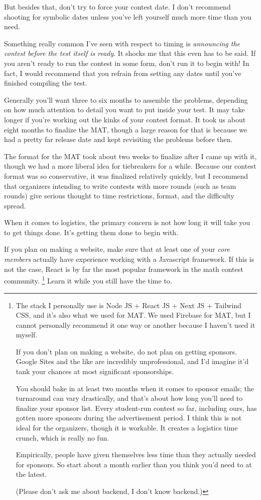 \documentclass[points=false]{bounce}
\begin{document}
But besides that, don't try to force your contest date. I don't recommend shooting for symbolic dates unless you've left yourself much more time than you need.

Something really common I've seen with respect to timing is \emph{announcing the contest before the test itself is ready}. It shocks me that this even has to be said. If you aren't ready to run the contest in some form, don't run it to begin with! In fact, I would recommend that you refrain from setting any dates until you've finished compiling the test.

Generally you'll want three to six months to assemble the problems, depending on how much attention to detail you want to put inside your test. It may take longer if you're working out the kinks of your contest format. It took us about eight months to finalize the MAT, though a large reason for that is because we had a pretty far release date and kept revisiting the problems before then.

The format for the MAT took about two weeks to finalize after I came up with it, though we had a more liberal idea for tiebreakers for a while. Because our contest format was so conservative, it was finalized relatively quickly, but I recommend that organizers intending to write contests with more rounds (such as team rounds) give serious thought to time restrictions, format, and the difficulty spread. 

When it comes to logistics, the primary concern is not how long it will take you to get things done. It's getting them done to begin with.

If you plan on making a website, make sure that at least one of your \emph{core members} actually have experience working with a Javascript framework.
If this is not the case, React is by far the most popular framework in the math contest community.
\footnote{The stack I personally use is Node JS + React JS + Next JS + Tailwind CSS, and it's also what we used for MAT. We used Firebase for MAT, but I cannot personally recommend it one way or another because I haven't used it myself.

If you don't plan on making a website, do not plan on getting sponsors. Google Sites and the like are incredibly unprofessional, and I'd imagine it'd tank your chances at most significant sponsorships.

You should bake in at least two months when it comes to sponsor emails; the turnaround can vary drastically, and that's about how long you'll need to finalize your sponsor list.
Every student-run contest so far, including ours, has gotten more sponsors during the advertisement period.
I think this is not ideal for the organizers, though it is workable. It creates a logistics time crunch, which is really no fun.

Empirically, people have given themselves less time than they actually needed for sponsors.
So start about a month earlier than you think you'd need to at the latest.

(Please don't ask me about backend, I don't know backend.)}
Learn it while you still have the time to.
\end{document}
